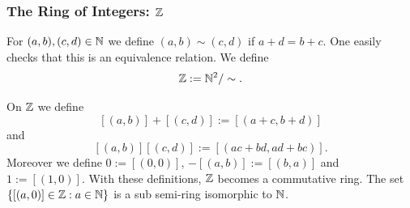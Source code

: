 \subsubsection{The Ring of Integers: $\mathbb{Z}$}
    \begin{definition}
        For $(a,b),(c,d)\in \mathbb{N}$ we define $(a,b)\sim (c,d)$ if $a+d=b+c$. One easily checks that this is an equivalence relation. We define 
        $$\mathbb{Z} := \mathbb{N}^2/\sim.$$
    \end{definition}
    \begin{proposition}
        On $\mathbb{Z}$ we define
        $$[(a,b)]+[(c,d)] := [(a+c,b+d)]$$
        and 
        $$[(a,b)][(c,d)] := [(ac+bd,ad+bc)].$$
        Moreover we define $0:=[(0,0)]$, $-[(a,b)]:=[(b,a)]$ and $1:= [(1,0)]$. With these definitions, $\mathbb{Z}$ becomes a commutative ring. The set $\{[(a,0)]\in \mathbb{Z} :a\in \mathbb{N}\}$ is a sub semi-ring isomorphic to $\mathbb{N}$.
    \end{proposition}
